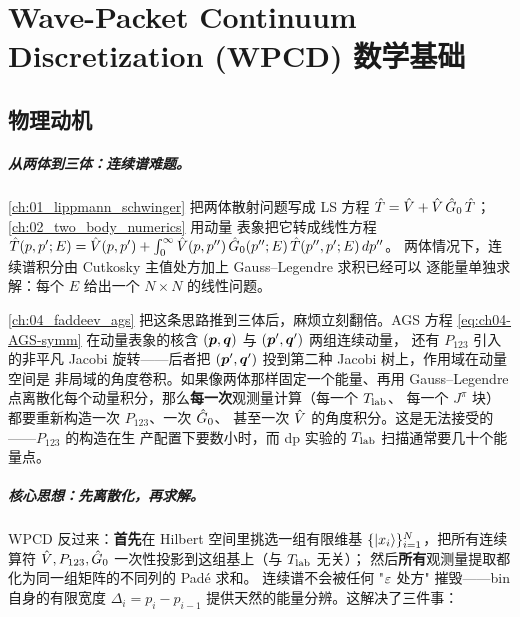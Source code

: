 
\chapter{Wave-Packet Continuum Discretization (WPCD) 数学基础}
\label{ch:05_wpcd_math}

\section{物理动机}
\label{sec:ch05-motivation}

\paragraph{从两体到三体：连续谱难题。}
\cref{ch:01_lippmann_schwinger} 把两体散射问题写成 LS 方程
\(\hat{T} = \hat{V} + \hat{V}\,\hat{G}_0\,\hat{T}\)；\cref{ch:02_two_body_numerics} 用动量
表象把它转成线性方程
\(\hat{T}(p, p'; E) = \hat{V}(p, p') + \int_0^\infty \hat{V}(p, p'')\,\hat{G}_0(p''; E)\,\hat{T}(p'', p'; E)\, dp''\)。
两体情况下，连续谱积分由 Cutkosky 主值处方加上 Gauss--Legendre 求积已经可以
逐能量单独求解：每个 \(E\) 给出一个 \(N \times N\) 的线性问题。

\cref{ch:04_faddeev_ags} 把这条思路推到三体后，麻烦立刻翻倍。AGS 方程
\cref{eq:ch04-AGS-symm} 在动量表象的核含
\((\bm{p}, \bm{q})\) 与 \((\bm{p}', \bm{q}')\) 两组连续动量，
还有 \(P_{123}\) 引入的非平凡 Jacobi 旋转——后者把
\((\bm{p}', \bm{q}')\) 投到第二种 Jacobi 树上，作用域在动量空间是
非局域的角度卷积。如果像两体那样固定一个能量、再用 Gauss--Legendre
点离散化每个动量积分，那么\textbf{每一次}观测量计算（每一个 \({T_{\text{lab}}}\)、
每一个 \(J^\pi\) 块）都要重新构造一次 \(P_{123}\)、一次 \(\hat{G}_0\)、
甚至一次 \(\hat{V}\) 的角度积分。这是无法接受的——\(P_{123}\) 的构造在生
产配置下要数小时，而 dp 实验的 \({T_{\text{lab}}}\) 扫描通常要几十个能量点。

\paragraph{核心思想：先离散化，再求解。}
WPCD 反过来：\textbf{首先}在 Hilbert 空间里挑选一组有限维基
\(\{ \ket{x_{i}} \}_{i=1}^{N}\)，把所有连续算符
\(\hat{V}, P_{123}, \hat{G}_0\) 一次性投影到这组基上（与 \({T_{\text{lab}}}\) 无关）；
然后\textbf{所有}观测量提取都化为同一组矩阵的不同列的 Padé 求和。
连续谱不会被任何 "\(\varepsilon\) 处方" 摧毁——bin 自身的有限宽度
\(\Delta_i = p_i - p_{i-1}\) 提供天然的能量分辨。这解决了三件事：

